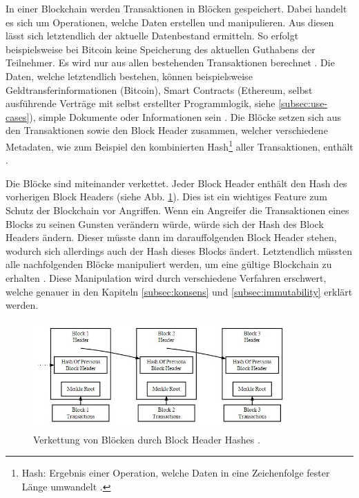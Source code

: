 In einer Blockchain werden Transaktionen in Blöcken gespeichert. Dabei handelt es sich um Operationen, welche Daten erstellen und manipulieren. Aus diesen lässt sich letztendlich der aktuelle Datenbestand ermitteln. So erfolgt beispielsweise bei Bitcoin keine Speicherung des aktuellen Guthabens der Teilnehmer. Es wird nur aus allen bestehenden Transaktionen berechnet \cite[S.~85]{AntonopoulosMasteringbitcoin2015}. Die Daten, welche letztendlich bestehen, können beispielsweise Geldtransferinformationen (Bitcoin), Smart Contracts (Ethereum, selbst ausführende Verträge mit selbst erstellter Programmlogik, siehe \ref{subsec:use-cases}), simple Dokumente oder Informationen sein \cite{EthereumTeamEthereumWhitePaper2017}\cite{NakamotoBitcoinPeertoPeerElectronic2008}\cite{HyperledgerFabricTeamHyperledgerWhitepaper2016}. Die Blöcke setzen sich aus den Transaktionen sowie den Block Header zusammen, welcher verschiedene Metadaten, wie zum Beispiel den kombinierten Hash\footnote{Hash: Ergebnis einer Operation, welche Daten in eine Zeichenfolge fester Länge umwandelt \cite[S.~\Rn{7}]{SwanBlockchainblueprintnew2015}.} aller Transaktionen, enthält \cite[S.~160-161]{AntonopoulosMasteringbitcoin2015}.

Die Blöcke sind miteinander verkettet. Jeder Block Header enthält den Hash  des vorherigen Block Headers (siehe Abb. \ref{fig:block-chain}). Dies ist ein wichtiges Feature zum Schutz der Blockchain vor Angriffen. Wenn ein Angreifer die Transaktionen eines Blocks zu seinen Gunsten verändern würde, würde sich der Hash des Block Headers ändern. Dieser müsste dann im darauffolgenden Block Header stehen, wodurch sich allerdings auch der Hash dieses Blocks ändert. Letztendlich müssten alle nachfolgenden Blöcke manipuliert werden, um eine gültige Blockchain zu erhalten \cite{NakamotoBitcoinPeertoPeerElectronic2008}. Diese Manipulation wird durch verschiedene Verfahren erschwert, welche genauer in den Kapiteln \ref{subsec:konsens} und \ref{subsec:immutability} erklärt werden.

\begin{figure}[!htbp]
  \centering
	\includegraphics[width=0.87\textwidth,angle=0]{images/block-chain}
 	\caption{Verkettung von Blöcken durch Block Header Hashes \cite{RosicWhatHashingHood2017}.}
	\label{fig:block-chain}
\end{figure}

